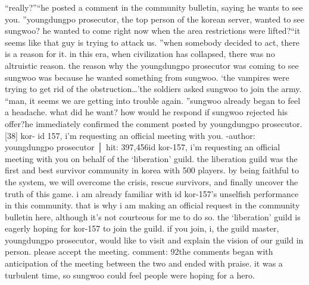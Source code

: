 “really?”“he posted a comment in the community bulletin, saying he wants to see you.
”youngdungpo prosecutor, the top person of the korean server, wanted to see sungwoo? he wanted to come right now when the area restrictions were lifted?“it seems like that guy is trying to attack us.
”when somebody decided to act, there is a reason for it.
in this era, when civilization has collapsed, there was no altruistic reason.
the reason why the youngdungpo prosecutor was coming to see sungwoo was because he wanted something from sungwoo.
‘the vampires were trying to get rid of the obstruction…’the soldiers asked sungwoo to join the army.
“man, it seems we are getting into trouble again.
”sungwoo already began to feel a headache.
 what did he want? how would he respond if sungwoo rejected his offer?he immediately confirmed the comment posted by youngdungpo prosecutor.
[38] kor- id 157, i’m requesting an official meeting with you.
-author: youngdungpo prosecutor │ hit: 397,456id kor-157, i’m requesting an official meeting with you on behalf of the ‘liberation’ guild.
the liberation guild was the first and best survivor community in korea with 500 players.
 by being faithful to the system, we will overcome the crisis, rescue survivors, and finally uncover the truth of this game.
i am already familiar with id kor-157’s unselfish performance in this community.
 that is why i am making an official request in the community bulletin here, although it’s not courteous for me to do so.
the ‘liberation’ guild is eagerly hoping for kor-157 to join the guild.
 if you join, i, the guild master, youngdungpo prosecutor, would like to visit and explain the vision of our guild in person.
 please accept the meeting.
comment: 92the comments began with anticipation of the meeting between the two and ended with praise.
 it was a turbulent time, so sungwoo could feel people were hoping for a hero.


 